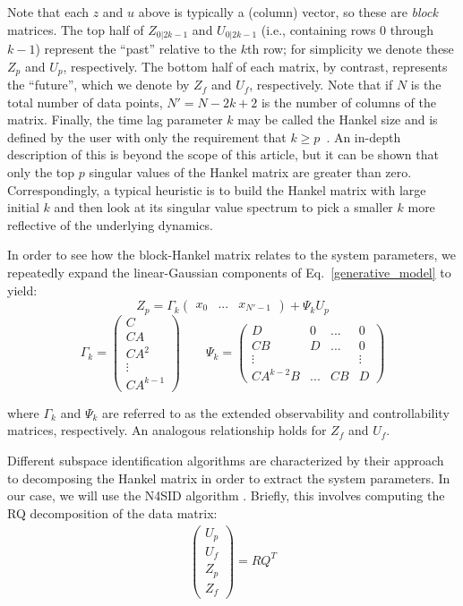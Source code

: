 Note that each $z$ and $u$ above is typically a (column) vector, so these are  \textit{block} matrices. The top half of $Z_{0|2k-1}$ and $U_{0|2k-1}$ (i.e., containing rows $0$ through $k-1$) represent the ``past'' relative to the $k$th row; for simplicity we denote these $Z_p$ and $U_p$, respectively.  The bottom half of each matrix, by contrast, represents the ``future'', which we denote by $Z_f$ and $U_f$, respectively. Note that if $N$ is the total number of data points, $N' = N - 2k + 2$ is the number of columns of the matrix. Finally, the time lag parameter $k$ may be called the Hankel size and is defined by the user with only the requirement that $k \geq p$~\cite{katayama_subspace_2005}. An in-depth description of this is beyond the scope of this article, but it can be shown that only the top $p$ singular values of the Hankel matrix are greater than zero. Correspondingly, a typical heuristic is to build the Hankel matrix with large initial $k$ and then look at its singular value spectrum to pick a smaller $k$ more reflective of the underlying dynamics. 

In order to see how the block-Hankel matrix relates to the system parameters, we repeatedly expand the linear-Gaussian components of  Eq.~\ref{generative_model} to yield:
$$
Z_p = \Gamma_k \begin{pmatrix}
    x_0 & ... & x_{N' - 1}
\end{pmatrix} + \Psi_k U_p
$$
$$
\Gamma_k = \begin{pmatrix}
        C \\
        CA \\
        CA^2 \\
        \vdots \\
        CA^{k - 1}
    \end{pmatrix} 
    \qquad
    \Psi_k = \begin{pmatrix}
        D & 0 & ... & 0 \\
        CB & D &  ... & 0 \\
        \vdots & & & \vdots \\
        CA^{k - 2}B & ... & CB & D
    \end{pmatrix}
$$

where $\Gamma_k$ and $\Psi_k$ are referred to as the extended observability and controllability matrices, respectively. An analogous relationship holds for $Z_f$ and $U_f$. 

Different subspace identification algorithms are characterized by their approach to decomposing the Hankel matrix in order to extract the system parameters. In our case, we will use the N4SID algorithm \cite{van_overschee_n4sid_1994}. Briefly, this involves computing the RQ decomposition of the data matrix:
\begin{align}
    \begin{pmatrix}
        U_p \\
        U_f \\
        Z_p \\
        Z_f
    \end{pmatrix} = RQ^T
    \label{LQ_decomp}
\end{align}


